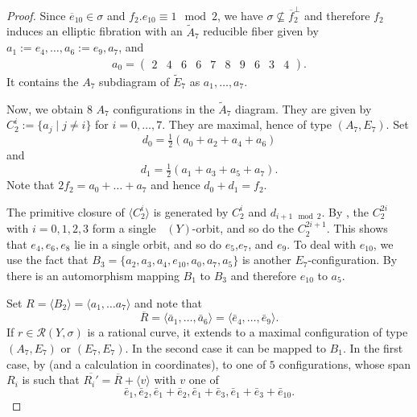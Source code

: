 \documentclass[a4paper]{amsart}
\theoremstyle{definition}
\theoremstyle{plain}
\DeclareMathOperator{\aut}{Aut^*}
\newcommand{\R}{\mathcal{R}}
\begin{document}
\begin{proof}
Since $\overline{e}_{10} \in \sigma$ and $f_2.e_{10}\equiv 1 \mod 2$, we have $\sigma \not\subseteq \overline{f}_2^\perp$ and therefore $f_2$ induces an elliptic fibration with an $\widetilde{A}_7$ reducible fiber given by $a_1:=e_4,\dots, a_6:=e_9, a_7$,   and
\begin{eqnarray}
a_0 =
\begin{pmatrix}
2& 4& 6& 6& 7& 8& 9& 6& 3& 4
\end{pmatrix}.\end{eqnarray}
It contains the $A_7$ subdiagram of $\widetilde{E}_7$ as $a_1,\dots, a_7$.
\begin{center}
\end{center}

Now, we obtain $8$ $A_7$ configurations in the $\widetilde{A}_7$ diagram. They are given by $C_2^{i}:=\{a_j \mid j \neq i\}$ for $i=0,\dots,7$.
They are maximal, hence of type $(A_7,E_7)$.
Set 
\[d_0 = \tfrac{1}{2}(a_0+a_2+a_4+a_6)\]
and 
\[d_1 = \tfrac{1}{2}(a_1+a_3+a_5+a_7).\]
Note that $2f_2 = a_0 + \dots+ a_7$ and hence $d_0 +d_1= f_2$.

The primitive closure of $\langle C_2^i\rangle $ is generated by $C_2^i$ and $d_{i+1 \mod 2}$.
By , the $C_2^{2i}$ with $i=0, 1,2,3$ form a single $\aut(Y)$-orbit, and so do the $C_2^{2i+1}$.
This shows that $e_4,e_6,e_8$ lie in a single orbit, and so do $e_5$,$e_7$, and $e_9$.
To deal with $e_{10}$, we use the fact that $B_3 = \{a_2,a_3,a_4,e_{10},a_0,a_7,a_5\}$ is another $E_7$-configuration. By  there is an automorphism mapping $B_1$ to $B_3$ and therefore $e_{10}$ to $a_5$. 

Set $R=\langle B_2 \rangle = \langle a_1,\dots a_7 \rangle$ and note that 
\[\overline{R} = \langle \bar a_1,\dots, \bar a_6\rangle=\langle \bar e_4,\dots, \bar e_9\rangle. \]
If $r \in \R(Y,\sigma)$ is a rational curve, it extends to a maximal configuration of type $(A_7,E_7)$ or $(E_7,E_7)$. In the second case it can be mapped to $B_1$. In the first case, by 
 (and a calculation in coordinates), to one of $5$ configurations, whose span $R_i$ is such that
$\overline{R_i'}=\overline{R}+\langle v \rangle $ with $v$ one of
\[\bar e_1, \bar e_2,\bar e_1+\bar e_2,\bar e_1+\bar e_3,\bar e_1+\bar e_3+\bar e_{10}.\]


\end{proof}
\end{document}
